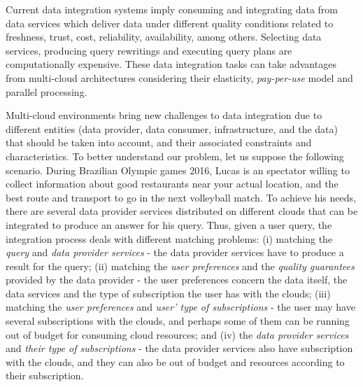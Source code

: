 Current data integration systems imply consuming and integrating data from data services which deliver data under different quality conditions related to freshness, trust, cost, reliability, availability, among others. Selecting data services, producing query rewritings and executing query plans are computationally expensive. These data integration tasks can take advantages from multi-cloud architectures considering their elasticity, \textit{pay-per-use} model and parallel processing.

Multi-cloud environments bring new challenges to data integration due to different entities (data provider, data consumer, infrastructure, and the data) that should be taken into account, and their associated constraints and characteristics. 
To better understand our problem, let us suppose the following scenario. During Brazilian Olympic games 2016, Lucas is an spectator willing to collect information about good restaurants near your actual location, and the best route and transport to go in the next volleyball match. To achieve his needs, there are several data provider services distributed on different clouds that can be integrated to produce an answer for his query. Thus, given a user query, the integration process deals with different matching problems: (i) matching the \textit{query} and \textit{data provider services} - the data provider services have to produce a result for the query; (ii) matching the \textit{user preferences} and the \textit{quality guarantees} provided by the data provider - the user preferences concern the data itself, the data services and the type of subscription the user has with the clouds; (iii) matching the \textit{user preferences} and \textit{user' type of subscriptions} - the user may have several subscriptions with the clouds, and perhaps some of them can be running out of budget for consuming cloud resources; and (iv) the \textit{data provider services} and \textit{their type of subscriptions} - the data provider services also have  subscription with the clouds, and they can also be out of budget and resources according to their subscription.

